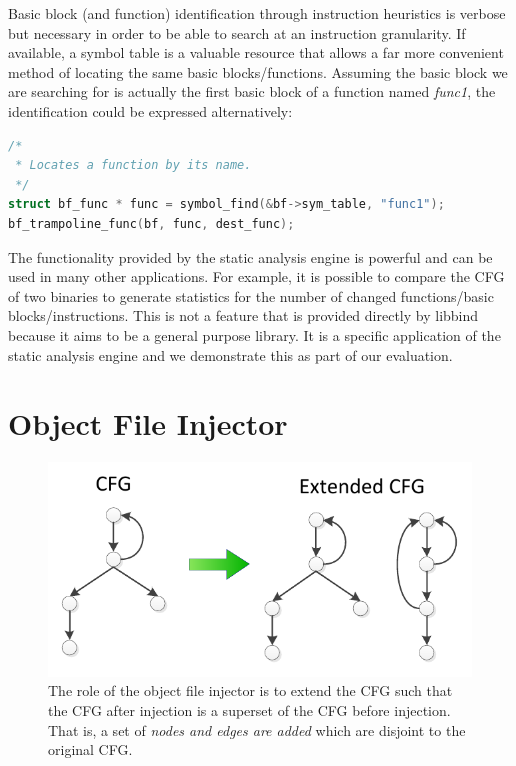 Basic block (and function) identification through instruction heuristics is verbose but necessary in order to be able to search at an instruction granularity. If available, a symbol table is a valuable resource that allows a far more convenient method of locating the same basic blocks/functions. Assuming the basic block we are searching for is actually the first basic block of a function named \emph{func1}, the identification could be expressed alternatively:

\begin{lstlisting}[language=C,caption={Identifying basic blocks via symbols}]
/*
 * Locates a function by its name.
 */
struct bf_func * func = symbol_find(&bf->sym_table, "func1");
bf_trampoline_func(bf, func, dest_func);
\end{lstlisting}

The functionality provided by the static analysis engine is powerful and can be used in many other applications. For example, it is possible to compare the CFG of two binaries to generate statistics for the number of changed functions/basic blocks/instructions. This is not a feature that is provided directly by libbind because it aims to be a general purpose library. It is a specific application of the static analysis engine and we demonstrate this as part of our evaluation.

\section{Object File Injector}

\begin{figure}[H]
 \centering
 \includegraphics{Object_File_Injector.pdf}
 \caption[Object File Injector]{The role of the object file injector is to extend the CFG such that the CFG after injection is a superset of the CFG before injection. That is, a set of \emph{nodes and edges are added} which are disjoint to the original CFG.}
\end{figure}

